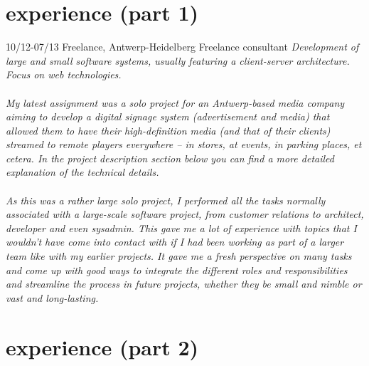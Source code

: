 \documentclass[]{friggeri-cv}
\begin{document}
\section{experience (part 1)}

\begin{entrylist}
  \entry
    {10/12-07/13}
    {Freelance, Antwerp-Heidelberg}
    {Freelance consultant}
    {\emph{Development of large and small software systems, usually featuring a client-server architecture. Focus on web technologies. \\\\ My latest assignment was a solo project for an Antwerp-based media company aiming to develop a digital signage system (advertisement and media) that allowed them to have their high-definition media (and that of their clients) streamed to remote players everywhere -- in stores, at events, in parking places, et cetera. In the project description section below you can find a more detailed explanation of the technical details. \\\\ As this was a rather large solo project, I performed all the tasks normally associated with a large-scale software project, from customer relations to architect, developer and even sysadmin. This gave me a lot of experience with topics that I wouldn't have come into contact with if I had been working as part of a larger team like with my earlier projects. It gave me a fresh perspective on many tasks and come up with good ways to integrate the different roles and responsibilities and streamline the process in future projects, whether they be small and nimble or vast and long-lasting.
    }}
\end{entrylist}

\clearpage

\section{experience (part 2)}
\end{document}
